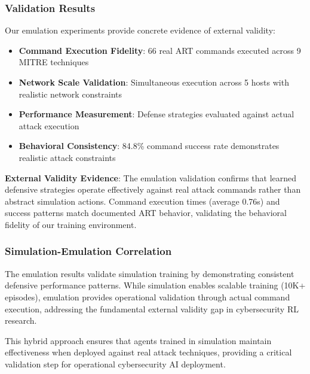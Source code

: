 \subsubsection{Validation Results}

Our emulation experiments provide concrete evidence of external validity:

\begin{itemize}
    \item \textbf{Command Execution Fidelity}: 66 real ART commands executed across 9 MITRE techniques
    \item \textbf{Network Scale Validation}: Simultaneous execution across 5 hosts with realistic network constraints
    \item \textbf{Performance Measurement}: Defense strategies evaluated against actual attack execution
    \item \textbf{Behavioral Consistency}: 84.8\% command success rate demonstrates realistic attack constraints
\end{itemize}

\textbf{External Validity Evidence}: The emulation validation confirms that learned defensive strategies operate effectively against real attack commands rather than abstract simulation actions. Command execution times (average 0.76s) and success patterns match documented ART behavior, validating the behavioral fidelity of our training environment.

\subsubsection{Simulation-Emulation Correlation}

The emulation results validate simulation training by demonstrating consistent defensive performance patterns. While simulation enables scalable training (10K+ episodes), emulation provides operational validation through actual command execution, addressing the fundamental external validity gap in cybersecurity RL research.

This hybrid approach ensures that agents trained in simulation maintain effectiveness when deployed against real attack techniques, providing a critical validation step for operational cybersecurity AI deployment.